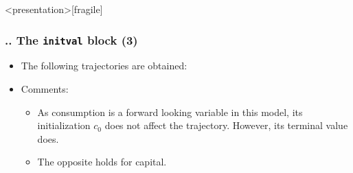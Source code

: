 \documentclass[11pt,aspectratio=169]{beamer}
\begin{document}
\begin{frame}<presentation>[fragile]
	\frametitle{{\thesection.\thesubsection.\thesubsubsection} The \texttt{initval} block (3)}
	\begin{itemize}
		\item The following trajectories are obtained:
		\begin{figure}
			\centering
			\qquad
			\qquad
		\end{figure}
		\item Comments:
			\begin{itemize}
				\item As consumption is a forward looking variable in this model, its initialization $c_0$ does not affect the trajectory. However, its terminal value does.
				\item The opposite holds for capital. 
			\end{itemize}
	\end{itemize}
\end{frame}
\end{document}
